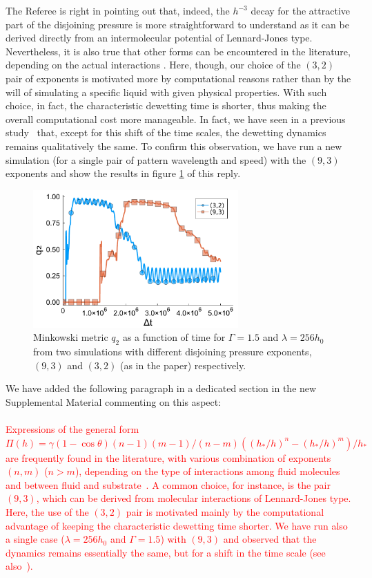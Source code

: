 \documentclass[12pt,english]{article}
\begin{document}
\begin{itemize}
{\item[ \textbf{Answer}]
{
The Referee is right in pointing out that, indeed, the $h^{-3}$ decay 
for the attractive part of the disjoining pressure is more straightforward 
to understand as it can be derived directly from an intermolecular potential of Lennard-Jones type. Nevertheless, it is also true that other forms
can be encountered in the literature, depending on the actual interactions
\cite{SCHWARTZ1998173,Mitlin,Teletzke}. Here, though, our choice of the $(3,2)$ pair of exponents is motivated more by computational reasons rather than by the will of 
simulating a specific liquid with given physical properties.
With such choice, in fact, the characteristic dewetting time 
is shorter, thus making the overall computational cost more manageable.
In fact, we have seen in a previous study~\cite{PhysRevE.104.034801} that,
except for this shift of the time scales, the dewetting dynamics remains 
qualitatively the same. To confirm this observation, we have run 
a new simulation (for a single pair of pattern wavelength and speed) 
with the $(9,3)$ exponents and show the results in figure \ref{fig:rivulets_9_3} of this reply.
\begin{figure}
    \centering
    \includegraphics[width=0.7\textwidth]{refBFig_1.pdf}
    \caption{Minkowski metric $q_2$ as a function of time for 
    $\Gamma = 1.5$ and $\lambda = 256 h_0$ from two simulations with different disjoining 
    pressure exponents, $(9,3)$ and $(3,2)$ (as in the paper) respectively.}
    \label{fig:rivulets_9_3}
\end{figure}
We have added the following paragraph in a dedicated section in the new
Supplemental Material commenting on this aspect:\\
\\
\textcolor{red}{Expressions of 
the general form $\Pi(h) = \gamma(1-\cos \theta)(n-1)(m-1)/(n-m)((h_{\ast}/h)^n - (h_{\ast}/h)^m)/h_{\ast}$
are frequently found in the literature, with various combination of exponents $(n,m)$ ($n>m$), depending
on the type of interactions among fluid molecules and between fluid and substrate~\cite{SCHWARTZ1998173,Mitlin,Teletzke}. A common choice, for instance, is the pair $(9,3)$, which 
can be derived from molecular interactions of Lennard-Jones type. Here, the use of the $(3,2)$ pair is motivated mainly by the computational advantage of keeping the characteristic dewetting time 
shorter. We have run also a single case ($\lambda=256 h_0$ and $\Gamma=1.5$) with $(9,3)$ and observed that 
the dynamics remains essentially the same, but for a shift in the time scale (see also~\cite{PhysRevE.104.034801}).}
}

}
\end{itemize}
\end{document}
